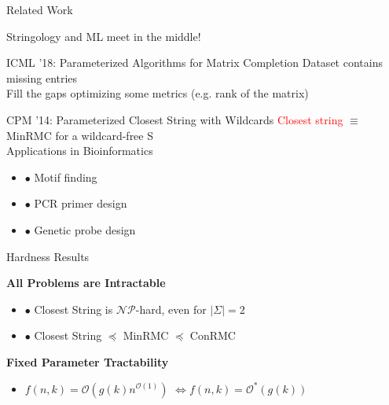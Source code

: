 \documentclass{beamer}
\renewcommand{\l}{\left}
\renewcommand{\r}{\right}
\begin{document}
\begin{frame}{Related Work}
  \begin{center}
    Stringology and ML meet in the middle!
  \end{center}
\pause
  \begin{block}{ICML '18: Parameterized Algorithms for Matrix
      Completion}
    Dataset contains missing entries \\
    Fill the gaps optimizing some metrics (e.g. rank of the matrix)    
  \end{block}
\pause
  \begin{block}{CPM '14: Parameterized Closest String
      with Wildcards}
    \textcolor{red}{Closest string} $\equiv$ MinRMC for a wildcard-free S \\
    Applications in Bioinformatics
    \begin{itemize}
    \item $\bullet$ Motif finding
    \item $\bullet$ PCR primer design
    \item $\bullet$ Genetic probe design
    \end{itemize}
    
  \end{block}
\end{frame}

\begin{frame}{Hardness Results}

  \begin{center}
    \textbf{All Problems are Intractable}
  \end{center}

  \begin{itemize}
  \item $\bullet$ Closest String is $\mathcal{NP}$-hard, even for
    $|\Sigma| = 2$
  \item $\bullet$ Closest String $\preceq$ MinRMC %
    $\preceq$ ConRMC
  \end{itemize}
\pause
  \begin{center}
    \textbf{Fixed Parameter Tractability}
  \end{center}
  
  \begin{itemize}
  \item $f(n, k) = \mathcal{O}\l(g(k) n^{\mathcal{O}(1)}\r)$ \pause
    $ \iff f(n, k) = \mathcal{O}^* \l(g(k)\r)$
  \end{itemize}
\end{frame}
\end{document}
